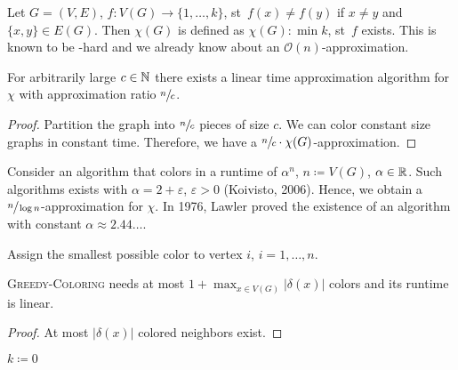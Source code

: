 \documentclass[../skript.tex]{subfiles}
\begin{document}
Let $G = (V, E)$, $f : V(G) \to \{ 1, \ldots, k\}$, \ac{st}~$f(x) \neq f(y)$ if $x \neq y$ and $\{ x, y \} \in E(G)$. Then $\chi(G)$ is defined as $\chi(G) : \min k$, \ac{st}~$f$ exists. This is known to be \NP-hard and we already know about an $\mathcal{O}(n)$-approximation.
\begin{proposition} %
\label{prop:32}
For arbitrarily large $c \in \mathbb{N}$ there exists a linear time approximation algorithm for $\chi$ with approximation ratio $\sfrac{n}{c}$.
\end{proposition}
\begin{proof}
Partition the graph into $\sfrac{n}{c}$ pieces of size $c$. We can color constant size graphs in constant time. Therefore, we have a $\sfrac{n}{c} \cdot \chi(G)$-approximation.
\end{proof}
Consider an algorithm that colors in a runtime of $\alpha^n$, $n \coloneqq V(G)$, $\alpha \in \mathbb{R}$. Such algorithms exists with $\alpha = 2 + \varepsilon$, $\varepsilon > 0$ (Koivisto, 2006). Hence, we obtain a $\sfrac{n}{\log n}$-approximation for $\chi$. In 1976, Lawler proved the existence of an algorithm with constant $\alpha \approx 2.44\ldots$.
\begin{algorithmbox}
\end{algorithmbox}
\vspace{-7pt}
\begin{algorithm}[H]
Assign the smallest possible color to vertex $i$, $i = 1, \ldots, n$.\;
\end{algorithm}
\vspace{-7pt}
\EndAlgorithmLine
\begin{theorem} %
\textsc{Greedy-Coloring} needs at most $1 + \max_{x \in V(G)} |\delta(x)|$ colors and its runtime is linear.
\end{theorem}
\begin{proof}
At most $|\delta(x)|$ colored neighbors exist.
\end{proof}
\begin{algorithmbox}
\end{algorithmbox}
\vspace{-7pt}
\begin{algorithm}[H]
$k \coloneqq 0$\;
\end{algorithm}
\vspace{-7pt}
\end{document}
